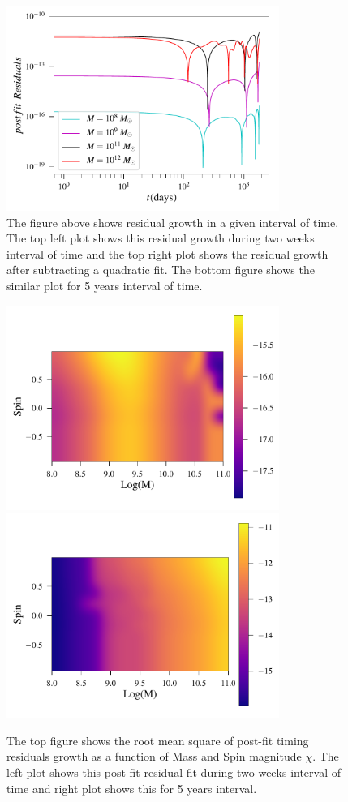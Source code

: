 \documentclass[twocolumn,showpacs,aps,prd,nobibnotes,floatfix]{revtex4-1}
\begin{document}
\begin{widetext}
\begin{figure}
	\includegraphics[width=3.5in]{../plots/PlotfromMathematicaData/ResidualGrowth5YearsDiffSpinsInDaysPostfit.pdf}
	\caption{The figure above shows residual growth in a given interval of time. The top left plot shows this residual growth during two weeks interval of time and the top right plot shows the residual growth after subtracting a quadratic fit. The bottom figure shows the similar plot for 5 years interval of time.}
	\label{fig:resedualGrowth}
\end{figure} 

\begin{figure}
	\includegraphics[width=3.5in]{../plots/PlotfromMathematicaData/MemoryResSpinvsMass14Days.pdf}
	\includegraphics[width=3.5in]{../plots/PlotfromMathematicaData/MemoryResSpinvsMass1825Days.pdf}
	\caption{The top figure shows the root mean square of post-fit timing residuals growth as a function of Mass and Spin magnitude $\chi$. The left plot shows this post-fit residual fit during two weeks interval of time and right plot shows this for 5 years interval.}
	\label{fig:MemoryMassVsSpin}
\end{figure}
\end{widetext}
\end{document}
